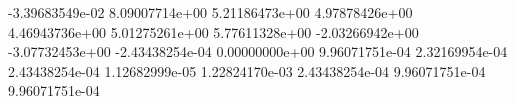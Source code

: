  -3.39683549e-02
 8.09007714e+00
 5.21186473e+00
 4.97878426e+00
 4.46943736e+00
 5.01275261e+00
 5.77611328e+00
 -2.03266942e+00
 -3.07732453e+00
 -2.43438254e-04
 0.00000000e+00
 9.96071751e-04
 2.32169954e-04
 2.43438254e-04
 1.12682999e-05
 1.22824170e-03
 2.43438254e-04
 9.96071751e-04
 9.96071751e-04
